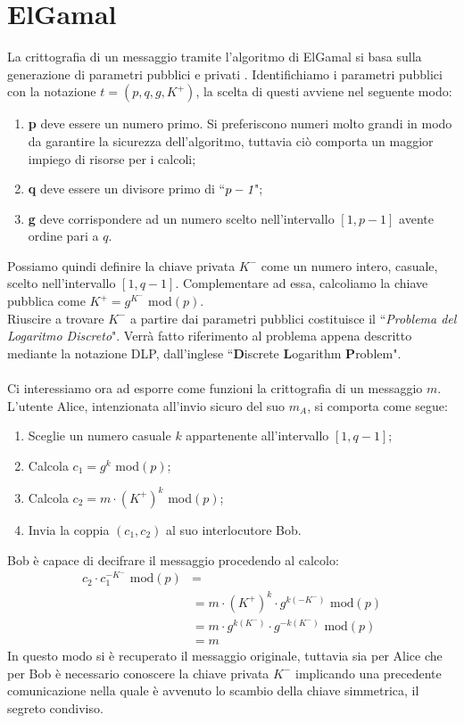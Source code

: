 \documentclass[a4paper,12pt]{tesiinfo}
\begin{document}
\section{ElGamal}
La crittografia di un messaggio tramite l'algoritmo di ElGamal si basa sulla generazione di parametri pubblici e privati \cite{guide to ECC}. Identifichiamo i parametri pubblici con la notazione $t = (p, q, g, K^+)$, la scelta di questi avviene nel seguente modo:
\begin{enumerate}
 \item \textbf{p} deve essere un numero primo. Si preferiscono numeri molto grandi in modo da garantire la sicurezza dell'algoritmo, tuttavia ci\`o comporta un maggior impiego di risorse per i calcoli;
 \item \textbf{q} deve essere un divisore primo di ``$p-\emph{1}$";
 \item \textbf{g} deve corrispondere ad un numero scelto nell'intervallo $[1, p-1]$ avente ordine pari a $q$.
\end{enumerate}
Possiamo quindi definire la chiave privata $K^-$ come un numero intero, casuale, scelto nell'intervallo $[1, q-1]$. Complementare ad essa, calcoliamo la chiave pubblica come $K^+ = g^{K^-}$ mod$(p)$.
\\
Riuscire a trovare $K^-$ a partire dai parametri pubblici costituisce il ``\textit{Problema del Logaritmo Discreto}". Verr\`a fatto riferimento al problema appena descritto mediante la notazione DLP, dall'inglese ``\textbf{D}iscrete \textbf{L}ogarithm \textbf{P}roblem". 
\\
\\
Ci interessiamo ora ad esporre come funzioni la crittografia di un messaggio $m$. L'utente Alice, intenzionata all'invio sicuro del suo $m_A$, si comporta come segue:
\begin{enumerate}
 \item Sceglie un numero casuale $k$ appartenente all'intervallo $[1, q-1]$;
 \item Calcola $c_1 = g^k$ mod$(p)$;
 \item Calcola $c_2 = m \cdot (K^+)^k$ mod$(p)$;
 \item Invia la coppia $(c_1, c_2)$ al suo interlocutore Bob. 
\end{enumerate}
Bob \`e capace di decifrare il messaggio procedendo al calcolo:
\begin{align*}
c_2 \cdot c_1^{-K^-} \text{ mod}(p) &=\\
 &= m \cdot (K^+)^k \cdot g^{k  (-K^-)} \text{ mod}(p)\\
 &= m \cdot g^{k  (K^-)} \cdot g^{-k (K^-)} \text{ mod}(p)\\
 &=m
\end{align*}
In questo modo si \`e recuperato il messaggio originale, tuttavia sia per Alice che per Bob \`e necessario conoscere la chiave privata $K^-$ implicando una precedente comunicazione nella quale \`e avvenuto lo scambio della chiave simmetrica, il segreto condiviso.
%
%
%
%
%
%
%
%
\end{document}

